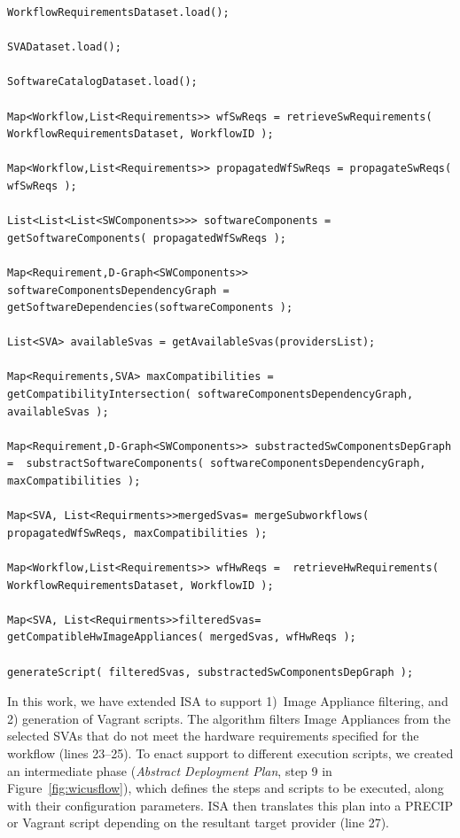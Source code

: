 \begin{lstlisting}[caption={Pseudo-code overview of the Infrastructure Specification Algorithm (ISA).},label={lst:pseudo}]
WorkflowRequirementsDataset.load();

SVADataset.load();

SoftwareCatalogDataset.load();

Map<Workflow,List<Requirements>> wfSwReqs = retrieveSwRequirements( WorkflowRequirementsDataset, WorkflowID );

Map<Workflow,List<Requirements>> propagatedWfSwReqs = propagateSwReqs( wfSwReqs );

List<List<List<SWComponents>>> softwareComponents = getSoftwareComponents( propagatedWfSwReqs );

Map<Requirement,D-Graph<SWComponents>> softwareComponentsDependencyGraph =    getSoftwareDependencies(softwareComponents );

List<SVA> availableSvas = getAvailableSvas(providersList);

Map<Requirements,SVA> maxCompatibilities = getCompatibilityIntersection( softwareComponentsDependencyGraph, availableSvas );

Map<Requirement,D-Graph<SWComponents>> substractedSwComponentsDepGraph =  substractSoftwareComponents( softwareComponentsDependencyGraph, maxCompatibilities );

Map<SVA, List<Requirments>>mergedSvas= mergeSubworkflows( propagatedWfSwReqs, maxCompatibilities );

Map<Workflow,List<Requirements>> wfHwReqs =  retrieveHwRequirements( WorkflowRequirementsDataset, WorkflowID );

Map<SVA, List<Requirments>>filteredSvas= getCompatibleHwImageAppliances( mergedSvas, wfHwReqs );

generateScript( filteredSvas, substractedSwComponentsDepGraph );
\end{lstlisting}

In this work, we have extended ISA to support 1)~Image Appliance filtering, and 
2) generation of Vagrant scripts. The algorithm filters Image Appliances from the 
selected SVAs that do not meet the hardware requirements specified for the workflow
(lines 23--25). To enact support to different execution scripts, we created an intermediate 
phase (\emph{Abstract Deployment Plan}, step 9 in Figure~\ref{fig:wicusflow}), which 
defines the steps and scripts to be executed, along with their configuration parameters. 
ISA then translates this plan into a PRECIP or Vagrant script depending on the resultant 
target provider (line 27).



